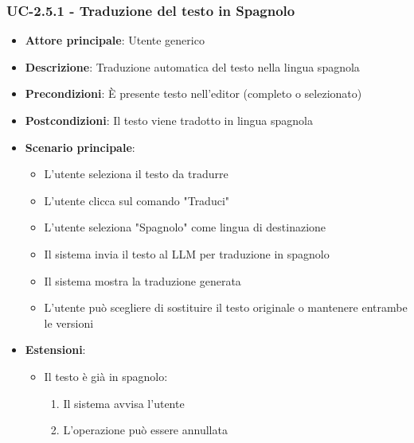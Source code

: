 \documentclass[11pt,a4paper]{article}
\begin{document}
\subsubsection{UC-2.5.1 - Traduzione del testo in Spagnolo}
\begin{itemize}
    \item \textbf{Attore principale}: Utente generico
    \item \textbf{Descrizione}: Traduzione automatica del testo nella lingua spagnola %
    \item \textbf{Precondizioni}: È presente testo nell'editor (completo o selezionato)
    \item \textbf{Postcondizioni}: Il testo viene tradotto in lingua spagnola
    \item \textbf{Scenario principale}:
        \begin{itemize}
            \item L'utente seleziona il testo da tradurre
            \item L'utente clicca sul comando "Traduci"
            \item L'utente seleziona "Spagnolo" come lingua di destinazione
            \item Il sistema invia il testo al LLM per traduzione in spagnolo
            \item Il sistema mostra la traduzione generata
            \item L'utente può scegliere di sostituire il testo originale o mantenere entrambe le versioni
        \end{itemize}
    \item \textbf{Estensioni}:
        \begin{itemize}
            \item Il testo è già in spagnolo:
                \begin{enumerate}
                    \item Il sistema avvisa l'utente
                    \item L'operazione può essere annullata
                \end{enumerate}
        \end{itemize}
\end{itemize}
\end{document}
